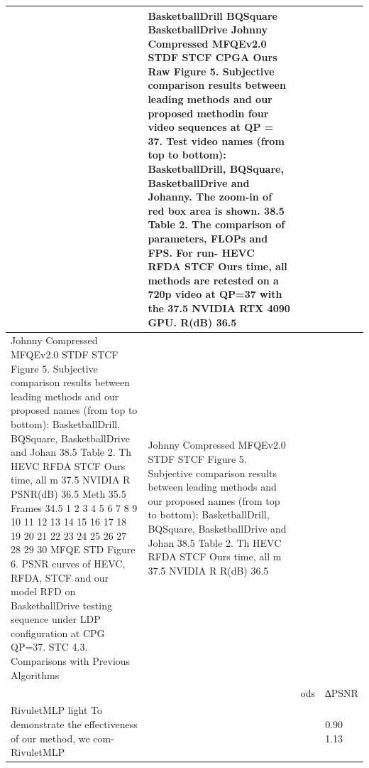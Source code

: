 \begin{tabular}{llll}
\toprule
 & BasketballDrill BQSquare BasketballDrive Johnny Compressed MFQEv2.0 STDF STCF CPGA Ours Raw Figure 5. Subjective comparison results between leading methods and our proposed methodin four video sequences at QP = 37. Test video names (from top to bottom): BasketballDrill, BQSquare, BasketballDrive and Johanny. The zoom-in of red box area is shown. 38.5 Table 2. The comparison of parameters, FLOPs and FPS. For run- HEVC RFDA STCF Ours time, all methods are retested on a 720p video at QP=37 with the 37.5 NVIDIA RTX 4090 GPU. R(dB) 36.5 &  &  \\
\midrule
Johnny Compressed MFQEv2.0 STDF STCF Figure 5. Subjective comparison results between leading methods and our proposed names (from top to bottom): BasketballDrill, BQSquare, BasketballDrive and Johan 38.5 Table 2. Th HEVC RFDA STCF Ours time, all m 37.5 NVIDIA R PSNR(dB) 36.5 Meth 35.5 Frames 34.5 1 2 3 4 5 6 7 8 9 10 11 12 13 14 15 16 17 18 19 20 21 22 23 24 25 26 27 28 29 30 MFQE STD Figure 6. PSNR curves of HEVC, RFDA, STCF and our model RFD on BasketballDrive testing sequence under LDP configuration at CPG QP=37. STC 4.3. Comparisons with Previous Algorithms & Johnny Compressed MFQEv2.0 STDF STCF Figure 5. Subjective comparison results between leading methods and our proposed names (from top to bottom): BasketballDrill, BQSquare, BasketballDrive and Johan 38.5 Table 2. Th HEVC RFDA STCF Ours time, all m 37.5 NVIDIA R R(dB) 36.5 &  &  \\
 &  & ods & ∆PSNR \\
RivuletMLP light To demonstrate the effectiveness of our method, we com- RivuletMLP &  &  & 0.90 1.13 \\
\bottomrule
\end{tabular}
